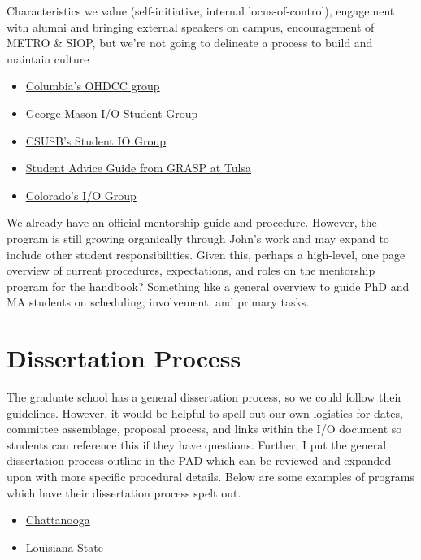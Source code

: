 \documentclass[
]{book}
\providecommand{\tightlist}{%
  \setlength{\itemsep}{0pt}\setlength{\parskip}{0pt}}
\begin{document}
Characteristics we value (self-initiative, internal locus-of-control), engagement with alumni and bringing external speakers on campus, encouragement of METRO \& SIOP, but we're not going to delineate a process to build and maintain culture

\begin{itemize}
\tightlist
\item
  \href{http://ohdcc.org/}{Columbia's OHDCC group}
\item
  \href{https://io.gmu.edu/iopsa}{George Mason I/O Student Group}
\item
  \href{https://artsandsciences.utulsa.edu/wp-content/uploads/sites/6/2015/02/GRASP-Handbook-2015-2016.pdf}{CSUSB's Student IO Group}
\item
  \href{https://artsandsciences.utulsa.edu/wp-content/uploads/sites/6/2015/02/GRASP-Handbook-2015-2016.pdf}{Student Advice Guide from GRASP at Tulsa}
\item
  \href{http://iopac.colostate.edu/}{Colorado's I/O Group}
\end{itemize}

We already have an official mentorship guide and procedure. However, the program is still growing organically through John's work and may expand to include other student responsibilities. Given this, perhaps a high-level, one page overview of current procedures, expectations, and roles on the mentorship program for the handbook? Something like a general overview to guide PhD and MA students on scheduling, involvement, and primary tasks.

\hypertarget{dissertation}{%
\chapter{Dissertation Process}\label{dissertation}}

The graduate school has a general dissertation process, so we could follow their guidelines. However, it would be helpful to spell out our own logistics for dates, committee assemblage, proposal process, and links within the I/O document so students can reference this if they have questions. Further, I put the general dissertation process outline in the PAD which can be reviewed and expanded upon with more specific procedural details. Below are some examples of programs which have their dissertation process spelt out.

\begin{itemize}
\tightlist
\item
  \href{https://www.utc.edu/doctorate-learning-leadership/doctoralguide/dissertationprocess/finaldefense.php}{Chattanooga}
\item
  \href{https://www.lsu.edu/hss/psychology/grad/io_graduate_handbook_2019-11-07.pdf}{Louisiana State}
\end{itemize}

  
\end{document}
